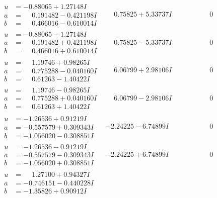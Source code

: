 \documentclass[1p]{elsarticle_modified}
\theoremstyle{definition}
\begin{document}
$$\begin{array}{c|c|c}
\begin{aligned}
u &= -0.88065 + 1.27148 I \\
a &= \phantom{-}0.191482 - 0.421198 I \\
b &= \phantom{-}0.466016 - 0.610014 I\end{aligned}
 & \phantom{-}0.75825 + 5.33737 I & \phantom{-0.000000 } 0 \\ \hline\begin{aligned}
u &= -0.88065 - 1.27148 I \\
a &= \phantom{-}0.191482 + 0.421198 I \\
b &= \phantom{-}0.466016 + 0.610014 I\end{aligned}
 & \phantom{-}0.75825 - 5.33737 I & \phantom{-0.000000 } 0 \\ \hline\begin{aligned}
u &= \phantom{-}1.19746 + 0.98265 I \\
a &= \phantom{-}0.775288 - 0.040160 I \\
b &= \phantom{-}0.61263 - 1.40422 I\end{aligned}
 & \phantom{-}6.06799 + 2.98106 I & \phantom{-0.000000 } 0 \\ \hline\begin{aligned}
u &= \phantom{-}1.19746 - 0.98265 I \\
a &= \phantom{-}0.775288 + 0.040160 I \\
b &= \phantom{-}0.61263 + 1.40422 I\end{aligned}
 & \phantom{-}6.06799 - 2.98106 I & \phantom{-0.000000 } 0 \\ \hline\begin{aligned}
u &= -1.26536 + 0.91219 I \\
a &= -0.557579 + 0.309343 I \\
b &= -1.056020 - 0.308851 I\end{aligned}
 & -2.24225 - 6.74899 I & \phantom{-0.000000 } 0 \\ \hline\begin{aligned}
u &= -1.26536 - 0.91219 I \\
a &= -0.557579 - 0.309343 I \\
b &= -1.056020 + 0.308851 I\end{aligned}
 & -2.24225 + 6.74899 I & \phantom{-0.000000 } 0 \\ \hline\begin{aligned}
u &= \phantom{-}1.27100 + 0.94327 I \\
a &= -0.746151 - 0.440228 I \\
b &= -1.35826 + 0.90912 I\end{aligned}

\end{array}$$
\end{document}
